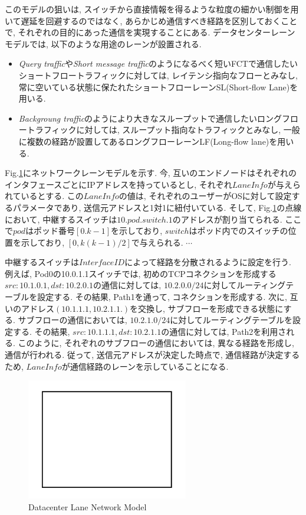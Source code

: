 このモデルの狙いは, スイッチから直接情報を得るような粒度の細かい制御を用いて遅延を回避するのではなく,
あらかじめ通信すべき経路を区別しておくことで, それぞれの目的にあった通信を実現することにある. 
データセンターレーンモデルでは, 以下のような用途のレーンが設置される. 
\begin{itemize}
\item {\it Query traffic}や{\it Short message
traffic}のようになるべく短いFCTで通信したいショートフロートラフィックに対しては, レイテンシ指向なフローとみなし,
常に空いている状態に保たれたショートフローレーンSL(Short-flow Lane)を用いる.
\item {\it Backgroung traffic}のようにより大きなスループットで通信したいロングフロートラフィックに対しては,
スループット指向なトラフィックとみなし, 一般に複数の経路が設置してあるロングフローレーンLF(Long-flow lane)を用いる. 
\end{itemize}

Fig.\ref{fig:lane_model}にネットワークレーンモデルを示す. 
今, 互いのエンドノードはそれぞれのインタフェースごとにIPアドレスを持っているとし, それぞれ$Lane Info$が与えられているとする. 
この$Lane Info$の値は, それぞれのユーザーがOSに対して設定するパラメータであり, 送信元アドレスと1対1に紐付いている. 
そして, Fig.\ref{fig:lane_model}の点線において, 中継するスイッチは$10.pod.switch.1$のアドレスが割り当てられる. 
ここで$pod$はポッド番号$[0. k-1]$を示しており, $switch$はポッド内でのスイッチの位置を示しており, $[0,
k(k-1)/2]$で与えられる. 
$\cdots$

中継するスイッチは$Interface ID$によって経路を分散されるように設定を行う. 
例えば, Pod0の10.0.1.1スイッチでは, 初めのTCPコネクションを形成する$src:10.1.0.1, dst:10.2.0.1$の通信に対しては,
$10.2.0.0/24$に対してルーティングテーブルを設定する. 
その結果, Path1を通って, コネクションを形成する. 
次に, 互いのアドレス$(10.1.1.1, 10.2.1.1.)$を交換し, サブフローを形成できる状態にする. 
サブフローの通信においては, $10.2.1.0/24$に対してルーティングテーブルを設定する. 
その結果, $src:10.1.1.1, dst:10.2.1.1$の通信に対しては, Path2を利用される. 
このように, それぞれのサブフローの通信においては, 異なる経路を形成し, 通信が行われる. 
従って, 送信元アドレスが決定した時点で, 通信経路が決定するため, $Lane Info$が通信経路のレーンを示していることになる.


\begin{figure}[t]
    \begin{center}
    \includegraphics[autoebb, width=200pt]{./img/test.pdf}
    \caption{Datacenter Lane Network Model}
    \label{fig:lane_model}
    \end{center}
\end{figure}

